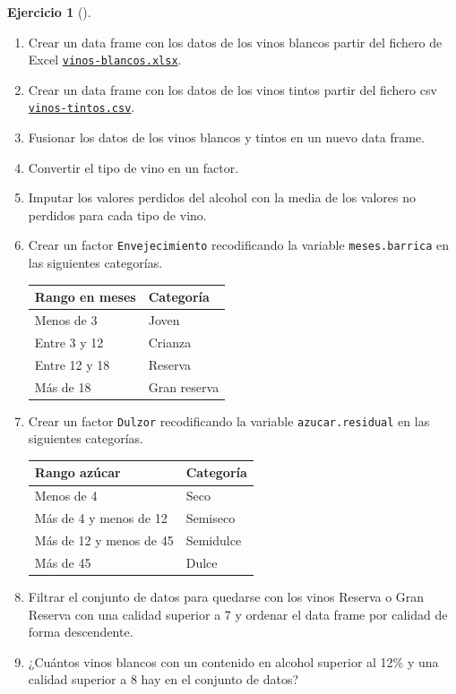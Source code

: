 \documentclass[
  spanish,
  a4paper,
]{scrreport}
\theoremstyle{definition}
\newtheorem{exercise}{Ejercicio}[chapter]
\theoremstyle{remark}
\begin{document}
\begin{exercise}[]
\begin{enumerate}
\def\labelenumi{\alph{enumi}.}
\item
  Crear un data frame con los datos de los vinos blancos partir del
  fichero de Excel
  \href{datos/vinos-blancos.xlsx}{\texttt{vinos-blancos.xlsx}}.
\item
  Crear un data frame con los datos de los vinos tintos partir del
  fichero csv \href{datos/vinos-tintos.csv}{\texttt{vinos-tintos.csv}}.
\item
  Fusionar los datos de los vinos blancos y tintos en un nuevo data
  frame.
\item
  Convertir el tipo de vino en un factor.
\item
  Imputar los valores perdidos del alcohol con la media de los valores
  no perdidos para cada tipo de vino.
\item
  Crear un factor \texttt{Envejecimiento} recodificando la variable
  \texttt{meses.barrica} en las siguientes categorías.

  \begin{longtable}[]{@{}ll@{}}
  \toprule\noalign{}
  Rango en meses & Categoría \\
  \midrule\noalign{}
  \endhead
  \bottomrule\noalign{}
  \endlastfoot
  Menos de 3 & Joven \\
  Entre 3 y 12 & Crianza \\
  Entre 12 y 18 & Reserva \\
  Más de 18 & Gran reserva \\
  \end{longtable}
\item
  Crear un factor \texttt{Dulzor} recodificando la variable
  \texttt{azucar.residual} en las siguientes categorías.

  \begin{longtable}[]{@{}ll@{}}
  \toprule\noalign{}
  Rango azúcar & Categoría \\
  \midrule\noalign{}
  \endhead
  \bottomrule\noalign{}
  \endlastfoot
  Menos de 4 & Seco \\
  Más de 4 y menos de 12 & Semiseco \\
  Más de 12 y menos de 45 & Semidulce \\
  Más de 45 & Dulce \\
  \end{longtable}
\item
  Filtrar el conjunto de datos para quedarse con los vinos Reserva o
  Gran Reserva con una calidad superior a 7 y ordenar el data frame por
  calidad de forma descendente.
\item
  ¿Cuántos vinos blancos con un contenido en alcohol superior al 12\% y
  una calidad superior a 8 hay en el conjunto de datos?
\end{enumerate}

\end{exercise}
\end{document}
